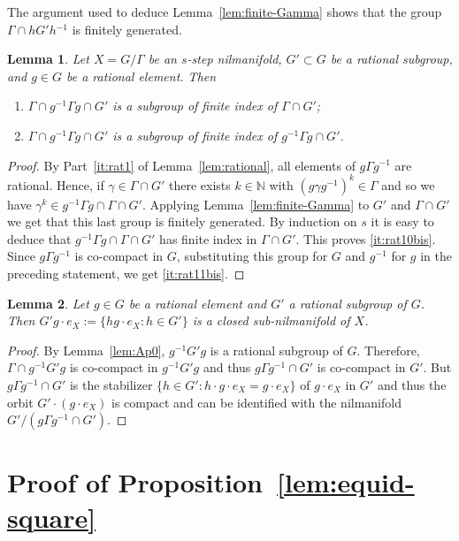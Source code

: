 \documentclass[11pt]{amsart}
\newtheorem{lemma}{Lemma}[section]
\theoremstyle{definition}
\begin{document}
 The argument used to deduce  Lemma~\ref{lem:finite-Gamma} shows that
  the group $\Gamma\cap
hG'h{^{-1}}$ is finitely generated.

\begin{lemma}
\label{lem:finite-index} Let $X=G/\Gamma$ be an $s$-step
nilmanifold, $G'\subset G$ be a rational subgroup, and $g\in G$ be a
rational element. Then
\begin{enumerate}
\item
\label{it:rat10bis}
$\Gamma\cap g{^{-1}} \Gamma g\cap G'$ is a subgroup of finite index  of
$\Gamma\cap G'$;
\item
\label{it:rat11bis}
 $\Gamma\cap g{^{-1}} \Gamma g\cap
G'$ is a subgroup of finite index  of $g{^{-1}} \Gamma g\cap G'$.
\end{enumerate}
\end{lemma}
\begin{proof}
By Part~\eqref{it:rat1} of Lemma~\ref{lem:rational},  all  elements
of $g\Gamma g{^{-1}}$  are rational.
 Hence, if $\gamma\in \Gamma\cap G'$ there exists $k\in{{\mathbb N}}$ with
$(g\gamma g{^{-1}})^k\in \Gamma$ and so we have $\gamma^k\in g{^{-1}}\Gamma g\cap \Gamma\cap G'$.
Applying Lemma~\ref{lem:finite-Gamma} to $G'$ and $\Gamma\cap G'$ we get that this last group is finitely generated. By induction on $s$ it is easy to deduce that $g{^{-1}}\Gamma g\cap \Gamma\cap G'$ has finite index in $\Gamma\cap G'$. This proves \eqref{it:rat10bis}.
Since $g\Gamma g{^{-1}}$  is co-compact in $G$,
substituting this group for $G$ and $g{^{-1}}$ for $g$ in the preceding
statement, we get  \eqref{it:rat11bis}.
\end{proof}

\begin{lemma}
\label{lem:Gprimey} Let $g\in G$ be a rational element and  $G'$ a
rational subgroup of $G$. Then $G'g\cdot e_X:=\{hg\cdot e_X\colon
h\in G'\}$ is a closed sub-nilmanifold of $X$.
\end{lemma}
\begin{proof}
By Lemma~\ref{lem:Ap0}, $g{^{-1}} G'g$ is a rational subgroup of $G$.
Therefore, $\Gamma\cap g{^{-1}} G'g$ is co-compact in $g{^{-1}} G'g$ and
thus $g\Gamma g{^{-1}}\cap G'$ is co-compact in $G'$. But $g\Gamma
g{^{-1}}\cap G'$ is the stabilizer $\{h\in G'\colon h\cdot g\cdot
e_X=g\cdot e_X\}$ of $g\cdot e_X$ in $G'$ and thus the orbit
$G'\cdot(g\cdot e_X)$ is compact and can be identified with the
nilmanifold $G'/(g\Gamma g{^{-1}}\cap G')$.
\end{proof}

\section{Proof of Proposition~\ref{lem:equid-square}}
\end{document}
